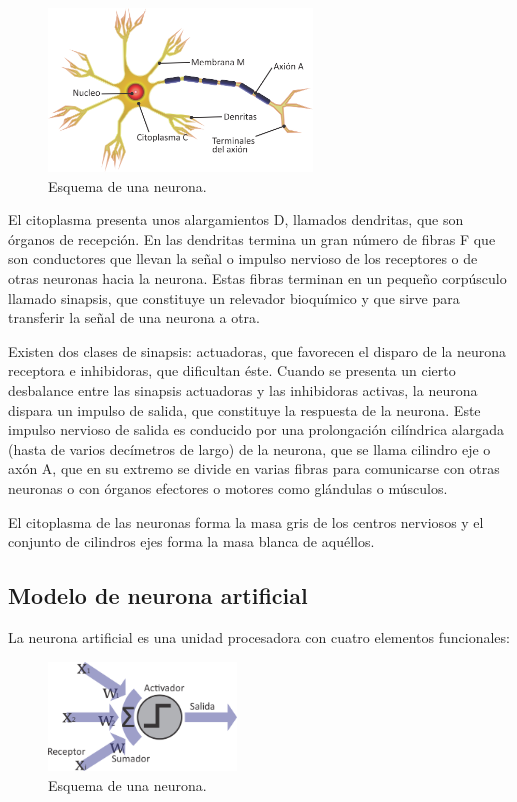 \begin{figure}[H]
	\centering
	\includegraphics[width=7cm]{img/fig_neuronScheme.png}
	\caption{Esquema de una neurona.}
	\label{fig:neuronScheme}
\end{figure}

El citoplasma presenta unos alargamientos D, llamados 
dendritas, que son \'organos de recepci\'on. En las dendritas
termina un gran n\'umero de fibras F que son conductores que
llevan la se\~nal o impulso nervioso de los receptores o de
otras neuronas hacia la neurona. Estas fibras terminan en un
peque\~no corp\'usculo llamado sinapsis, que constituye un
relevador bioqu\'imico y que sirve para transferir la se\~nal de
una neurona a otra.

Existen dos clases de sinapsis: actuadoras, que
favorecen el disparo de la neurona receptora e inhibidoras,
que dificultan \'este. Cuando se presenta un cierto desbalance
entre las sinapsis actuadoras y las inhibidoras activas, la
neurona dispara un impulso de salida, que constituye la
respuesta de la neurona. Este impulso nervioso de salida es
conducido por una prolongaci\'on cil\'indrica alargada (hasta de
varios dec\'imetros de largo) de la neurona, que se llama
cilindro eje o ax\'on A, que en su extremo se divide en varias
fibras para comunicarse con otras neuronas o con \'organos
efectores o motores como gl\'andulas o m\'usculos.

El citoplasma de las neuronas forma la masa gris de los
centros nerviosos y el conjunto de cilindros ejes forma la
masa blanca de aqu\'ellos.

\subsection{Modelo de neurona artificial}
La neurona artificial es una unidad procesadora con
cuatro elementos funcionales: 

\begin{figure}[H]
	\centering
	\includegraphics[width=5cm]{img/fig_artifitialNeuron.png}
	\caption{Esquema de una neurona.}
	\label{fig:artifitialNeuron}
\end{figure}

